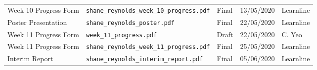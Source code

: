 \documentclass[10pt, landscape]{article}
\begin{document}
\begin{longtable}{p{7cm}p{10cm}p{1.5cm}p{2cm}p{2cm}}
	Week 10 Progress Form							& \verb|shane_reynolds_week_10_progress.pdf|								& Final				& 13/05/2020			& Learnline\\
	
	Poster Presentation								& \verb|shane_reynolds_poster.pdf|											& Final				& 22/05/2020			& Learnline\\
	
	Week 11 Progress Form							& \verb|week_11_progress.pdf|												& Draft				& 22/05/2020			& C. Yeo\\
						
	Week 11 Progress Form							& \verb|shane_reynolds_week_11_progress.pdf|								& Final				& 25/05/2020			& Learnline\\
	
	Interim Report									& \verb|shane_reynolds_interim_report.pdf|									& Final				& 05/06/2020			& Learnline\\
	
	\bottomrule
	\end{longtable}
\end{document}
